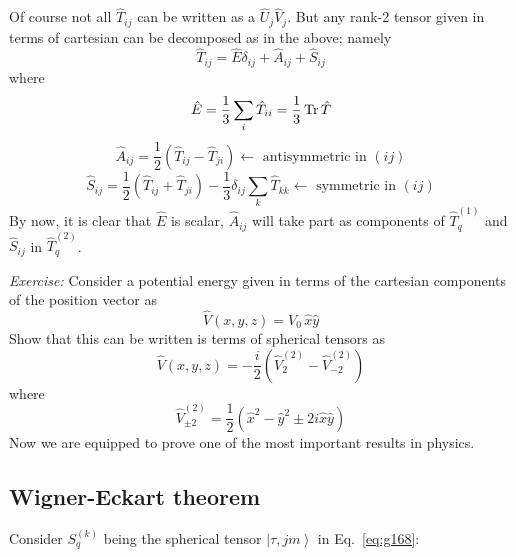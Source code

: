\documentclass[12pt]{article}
\newcommand{\be}{\begin{equation}}
\newcommand{\ee}{\end{equation}}
\begin{document}
Of course not all $\hat{T}_{ij}$ can be written as a $\hat{U}_j\hat{V}_j$. But
any rank-2 tensor given in terms of cartesian
can be decomposed as in the above; namely
\be
\hat{T}_{i j}=\hat{E} \delta_{i j}+\hat{A}_{i j}+\hat{S}_{i j}
\ee
where
\be
\hat{E}=\frac{1}{3} \sum_{i} \hat{T}_{ii}=\frac{1}{3} \Tr \hat{T}
\ee
%
\be
\hat{A}_{i j}=\frac{1}{2}\left(\hat{T}_{i j}-\hat{T}_{j i}\right) \leftarrow \text{ antisymmetric in }(ij)
\ee
%
\be
\hat{S}_{i j}=\frac{1}{2}\left(\hat{T}_{i j}+\hat{T}_{j i}\right)-\frac{1}{3} \delta_{i j} \sum_{k} \hat{T}_{kk} \leftarrow \text{ symmetric in }(ij)
\ee
By now, it is clear that \(\hat{E}\) is scalar, \(\hat{A}_{i j}\) will
take part as components of \(\hat{T}_{q}^{(1)}\) and \(\hat{S}_{i j}\) in \(\hat{T}_{q}^{(2)}\).

\emph{Exercise:} Consider a potential energy given in terms
of the cartesian components of the position vector as
\be
\hat{V}(x, y, z)=V_{0}\,\hat{x} \hat{y}
\ee
Show that this can be written is terms of spherical
tensors as
\be
\hat{V}(x, y, z)=-\frac{i}{2}\left(\hat{V}_{2}^{(2)}-\hat{V}_{-2}^{(2)}\right)
\ee
where
\be
\hat{V}_{\pm2}^{(2)} = \frac{1}{2}\left(\hat{x}^2-\hat{y}^2\pm2i\hat{x}\hat{y}\right)
\ee
Now we are equipped to prove one of
the most important results in physics.


\subsection{Wigner-Eckart theorem}

Consider \(S_{q}^{(k)}\) being the spherical tensor \(\left|\tau, j m\right\rangle\)
in Eq.~\eqref{eq:g168}:
\end{document}

